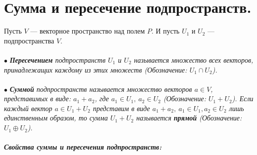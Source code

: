 \section{Сумма и пересечение подпространств.}
Пусть $V$ --- векторное пространство над полем $P$. И пусть $U_1$ и $U_2$ --- подпространства $V$.\\\\
$\bullet$ \textit{\textbf{Пересечением} подпространств $U_1$ и $U_2$ называется множество всех векторов, принадлежащих каждому из этих множеств (Обозначение: $U_1 \cap U_2$).}\\\\
$\bullet$ \textit{\textbf{Суммой} подпространств называется множество векторов $a\in V$, представимых в виде: $a_1+a_2$, где $a_1 \in U_1,\ a_2\in U_2$ (Обозначение: $U_1 + U_2$). Если каждый вектор $a\in U_1 + U_2$ представим в виде $a_1 + a_2,\ a_1 \in U_1, a_2 \in U_2$ лишь единственным образом, то сумма $U_1 + U_2$ называется \textbf{прямой} (Обозначение: $U_1\oplus U_2$).}\\\\
\textbf{\textit{Свойства суммы и пересечения подпространств:}}

